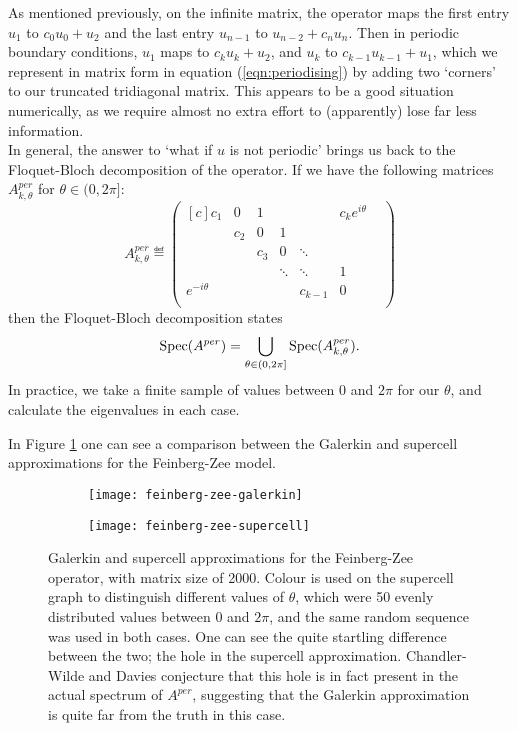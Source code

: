 \documentclass[../main.tex]{subfiles}
\begin{document}
As mentioned previously, on the infinite matrix, the operator maps the first
entry $u_1$ to $c_0 u_0 + u_2$ and the last entry $u_{n-1}$ to $u_{n-2} + c_{n}
u_{n}$. Then in periodic boundary conditions, $u_1$ maps to $c_k u_k + u_2$, and
$u_{k}$ to $c_{k-1} u_{k-1} + u_{1}$, which we represent in matrix form in
equation (\ref{eqn:periodising}) by adding two `corners' to our truncated
tridiagonal matrix. This appears to be a good situation numerically, as we
require almost no extra effort to (apparently) lose far less information.\\

In general, the answer to `what if $u$ is not periodic' brings us back to the
Floquet-Bloch decomposition of the operator. If we have the following matrices
$A^{per}_{k, \theta}$ for $\theta \in (0, 2 \pi]$:
  $$ 
  A^{per}_{k, \theta} \eqdef
  \begin{pmatrix*}[c]
    c_1 & 0 & 1 & & & c_{k} e^{i \theta}\\
    & c_2 & 0 & 1 & & & \\
    & & c_3 & 0 & \ddots & & \\
    & & & \ddots & \ddots & 1 & \\
    e^{- i \theta} & & & & c_{k-1} & 0 \\
  \end{pmatrix*} 
  $$
then the Floquet-Bloch decomposition states 
  $$\mathrm{Spec}(A^{per}) = \bigcup_{\theta \in (0, 2 \pi]} \mathrm{Spec}(A^{per}_{k, \theta}).$$
In practice, we take a finite sample of values between 0 and $2 \pi$ for our
$\theta$, and calculate the eigenvalues in each case. 

In Figure \ref{fig:feinberg-zee} one can see a comparison between the Galerkin
and supercell approximations for the Feinberg-Zee model. 

\begin{figure}[h!]
\centering
\begin{subfigure}{0.4\textwidth}
  \texttt{[image: feinberg-zee-galerkin]}
  \end{subfigure} \begin{subfigure}{0.4\textwidth}
  \texttt{[image: feinberg-zee-supercell]} \end{subfigure}
  \caption{Galerkin and supercell approximations for the Feinberg-Zee operator,
	with matrix size of 2000. Colour is used on the supercell graph to
	distinguish different values of $\theta$, which were 50 evenly
	distributed values between $0$ and $2 \pi$, and the same random
	sequence was used in both cases. One can see the quite startling
	difference between the two; the hole in the supercell approximation.
	Chandler-Wilde and Davies \cite{chandler-wilde2012spectrum} conjecture
	that this hole is in fact present in the actual spectrum of $A^{per}$,
        suggesting that the Galerkin approximation is quite far from the truth
        in this case.}
\label{fig:feinberg-zee}
\end{figure}
\clearpage
\end{document}
